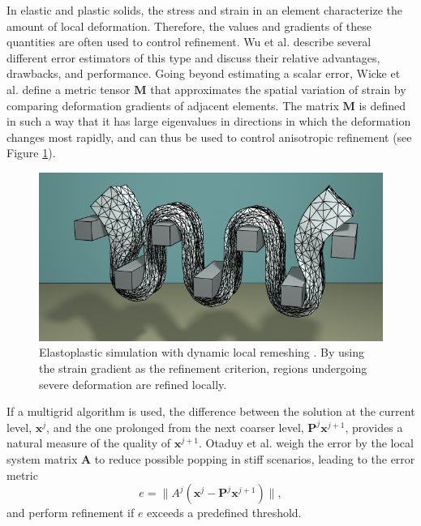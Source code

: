 In elastic and plastic solids, the stress and strain in an element characterize the amount of local deformation.
Therefore, the values and gradients of these quantities are often used to control refinement.
Wu et al. \cite{Wu2001} describe several different error estimators of this type and discuss their relative advantages, drawbacks, and performance.
Going beyond estimating a scalar error, Wicke et al. \cite{Wicke2010} define a metric tensor $\mathbf M$ that approximates the spatial variation of strain by comparing deformation gradients of adjacent elements.
The matrix $\mathbf M$ is defined in such a way that it has large eigenvalues in directions in which the deformation changes most rapidly, and can thus be used to control anisotropic refinement (see Figure \ref{fig:Wicke2010}).

\begin{figure}[t]
  \centering
  \includegraphics[width=\linewidth]{images/starAdaptivity-cgf2016/mesh-plastic.png}
  \caption{Elastoplastic simulation with dynamic local remeshing \cite{Wicke2010}. By using the strain gradient as the refinement criterion, regions undergoing severe deformation are refined locally.}
  \label{fig:Wicke2010}
\end{figure}

If a multigrid algorithm is used, the difference between the solution at the current level, $\mathbf x^j$, and the one prolonged from the next coarser level, $\mathbf P^j\mathbf x^{j+1}$, provides a natural measure of the quality of $\mathbf x^{j+1}$.
Otaduy et al. \cite{Otaduy2007} weigh the error by the local system matrix $\mathbf A$ to reduce possible popping in stiff scenarios, leading to the error metric
\begin{equation}
	e = \|A^j(\mathbf x^j-\mathbf P^j\mathbf x^{j+1})\|,
\end{equation}
and perform refinement if $e$ exceeds a predefined threshold.


